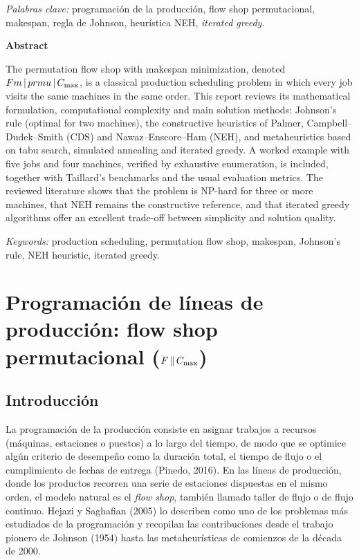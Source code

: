 \noindent\textit{Palabras clave:} programación de la producción, flow shop
permutacional, makespan, regla de Johnson, heurística NEH, \textit{iterated greedy}.

\bigskip
\begin{center}\textbf{Abstract}\end{center}
\noindent
The permutation flow shop with makespan minimization, denoted
$Fm\,|\,prmu\,|\,C_{\max}$, is a classical production scheduling problem in which every
job visits the same machines in the same order. This report reviews its
mathematical formulation, computational complexity and main solution methods:
Johnson's rule (optimal for two machines), the constructive heuristics of Palmer,
Campbell--Dudek--Smith (CDS) and Nawaz--Enscore--Ham (NEH), and metaheuristics based
on tabu search, simulated annealing and iterated greedy. A worked example with five
jobs and four machines, verified by exhaustive enumeration, is included, together
with Taillard's benchmarks and the usual evaluation metrics. The reviewed literature
shows that the problem is NP-hard for three or more machines, that NEH remains the
constructive reference, and that iterated greedy algorithms offer an excellent
trade-off between simplicity and solution quality.

\noindent\textit{Keywords:} production scheduling, permutation flow shop, makespan,
Johnson's rule, NEH heuristic, iterated greedy.
\newpage

{\singlespacing
\tableofcontents
\listoffigures
\listoftables}
\newpage

\section{Programación de líneas de producción: flow shop permutacional ($F\,\|\,C_{\max}$)}

\subsection{Introducción}

La programación de la producción consiste en asignar trabajos a recursos
(máquinas, estaciones o puestos) a lo largo del tiempo, de modo que se optimice
algún criterio de desempeño como la duración total, el tiempo de flujo o el
cumplimiento de fechas de entrega (Pinedo, 2016). En las líneas de producción,
donde los productos recorren una serie de estaciones dispuestas en el mismo
orden, el modelo natural es el \textit{flow shop}, también llamado taller de flujo
o de flujo continuo. Hejazi y Saghafian (2005) lo describen como uno de los
problemas más estudiados de la programación y recopilan las contribuciones
desde el trabajo pionero de Johnson (1954) hasta las metaheurísticas de comienzos
de la década de 2000.

